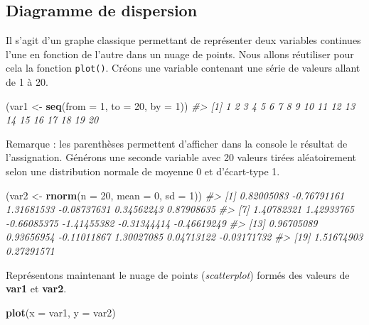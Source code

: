 \documentclass[]{article}
\newenvironment{Shaded}{\begin{snugshade}}{\end{snugshade}}
\newcommand{\CommentTok}[1]{\textcolor[rgb]{0.56,0.35,0.01}{\textit{#1}}}
\newcommand{\DataTypeTok}[1]{\textcolor[rgb]{0.13,0.29,0.53}{#1}}
\newcommand{\DecValTok}[1]{\textcolor[rgb]{0.00,0.00,0.81}{#1}}
\newcommand{\KeywordTok}[1]{\textcolor[rgb]{0.13,0.29,0.53}{\textbf{#1}}}
\newcommand{\NormalTok}[1]{#1}
\newcommand{\StringTok}[1]{\textcolor[rgb]{0.31,0.60,0.02}{#1}}
\begin{document}
\hypertarget{diagramme-de-dispersion}{%
\subsection{Diagramme de dispersion}\label{diagramme-de-dispersion}}

Il s'agit d'un graphe classique permettant de représenter deux variables continues l'une en fonction de l'autre dans un nuage de points. Nous allons réutiliser pour cela la fonction \texttt{plot()}.
Créons une variable contenant une série de valeurs allant de 1 à 20.

\begin{Shaded}
\begin{Highlighting}[]
\NormalTok{(var1 <-}\StringTok{ }\KeywordTok{seq}\NormalTok{(}\DataTypeTok{from =} \DecValTok{1}\NormalTok{, }\DataTypeTok{to =} \DecValTok{20}\NormalTok{, }\DataTypeTok{by =} \DecValTok{1}\NormalTok{))}
\CommentTok{#>  [1]  1  2  3  4  5  6  7  8  9 10 11 12 13 14 15 16 17 18 19 20}
\end{Highlighting}
\end{Shaded}

Remarque : les parenthèses permettent d'afficher dans la console le résultat de l'assignation. Générons une seconde variable avec 20 valeurs tirées aléatoirement selon une distribution normale de moyenne 0 et d'écart-type 1.

\begin{Shaded}
\begin{Highlighting}[]
\NormalTok{(var2 <-}\StringTok{ }\KeywordTok{rnorm}\NormalTok{(}\DataTypeTok{n =} \DecValTok{20}\NormalTok{, }\DataTypeTok{mean =} \DecValTok{0}\NormalTok{, }\DataTypeTok{sd =} \DecValTok{1}\NormalTok{))}
\CommentTok{#>  [1]  0.82005083 -0.76791161  1.31681533 -0.08737631  0.34562243  0.87908635}
\CommentTok{#>  [7]  1.40782321  1.42933765 -0.66085375 -1.41455382 -0.31344414 -0.46619249}
\CommentTok{#> [13]  0.96705089  0.93656954 -0.11011867  1.30027085  0.04713122 -0.03171732}
\CommentTok{#> [19]  1.51674903  0.27291571}
\end{Highlighting}
\end{Shaded}

Représentons maintenant le nuage de points (\emph{scatterplot}) formés des valeurs de \textbf{var1} et \textbf{var2}.

\begin{Shaded}
\begin{Highlighting}[]
\KeywordTok{plot}\NormalTok{(}\DataTypeTok{x =}\NormalTok{ var1, }\DataTypeTok{y =}\NormalTok{ var2)}
\end{Highlighting}
\end{Shaded}
\end{document}
